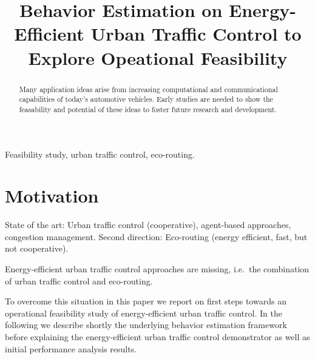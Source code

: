 \documentclass[conference]{../cls/IEEEtran}
\begin{document}
\title{Behavior Estimation on Energy-Efficient Urban Traffic Control to Explore Opeational Feasibility}

\author{
	\and
}

\maketitle

\begin{abstract}
Many application ideas arise from increasing computational and communicational capabilities of today's automotive vehicles.
Early studies are needed to show the feasability and potential of these ideas to foster future research and development.
\end{abstract}

\begin{IEEEkeywords}
Feasibility study, urban traffic control, eco-routing.
\end{IEEEkeywords}

\section{Motivation}

State of the art: Urban traffic control (cooperative), agent-based approaches, congestion management. 
Second direction: Eco-routing (energy efficient, fast, but not cooperative).

Energy-efficient urban traffic control approaches are missing, i.e.\ the combination of urban traffic control and eco-routing.

To overcome this situation in this paper we report on first steps towards an operational feasibility study of energy-efficient urban traffic control.
In the following we describe shortly the underlying behavior estimation framework before explaining the energy-efficient urban traffic control demonstrator as well as initial performance analysis results.
\end{document}
